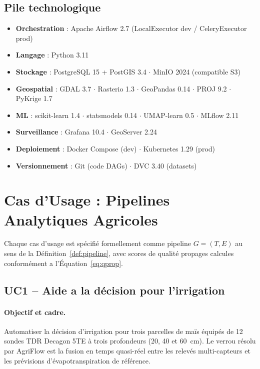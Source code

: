 \documentclass[12pt]{article}
\begin{document}
	\subsection{Pile technologique}
\begin{resultbox}
	\begin{itemize}[noitemsep,leftmargin=1.2em]
		\item \textbf{Orchestration} : Apache Airflow 2.7
		(LocalExecutor dev / CeleryExecutor prod)
		\item \textbf{Langage} : Python 3.11
		\item \textbf{Stockage} : PostgreSQL 15 + PostGIS 3.4 $\cdot$
		MinIO 2024 (compatible S3)
		\item \textbf{Geospatial} : GDAL 3.7 $\cdot$ Rasterio 1.3 $\cdot$
		GeoPandas 0.14 $\cdot$ PROJ 9.2 $\cdot$ PyKrige 1.7
		\item \textbf{ML} : scikit-learn 1.4 $\cdot$ statsmodels 0.14 $\cdot$
		UMAP-learn 0.5 $\cdot$ MLflow 2.11
		\item \textbf{Surveillance} : Grafana 10.4 $\cdot$ GeoServer 2.24
		\item \textbf{Deploiement} : Docker Compose (dev) $\cdot$
		Kubernetes 1.29 (prod)
		\item \textbf{Versionnement} : Git (code DAGs) $\cdot$
		DVC 3.40 (datasets)
	\end{itemize}
\end{resultbox}

	\section{Cas d'Usage : Pipelines Analytiques Agricoles}
\label{sec:usecases}

Chaque cas d'usage est spécifié formellement comme pipeline
$G=(T,E)$ au sens de la Définition~\ref{def:pipeline}, avec
scores de qualité propages calcules conformément a
l’Équation~\eqref{eq:qprop}.

\subsection{UC1 -- Aide a la décision pour l'irrigation}
\label{subsec:uc1}
\paragraph{Objectif et cadre.}
Automatiser la décision d'irrigation pour trois parcelles de maïs
équipés de 12 sondes TDR Decagon 5TE à trois profondeurs
(20, 40 et 60~cm). Le verrou résolu par AgriFlow est la fusion
en temps quasi-réel entre les relevés multi-capteurs et les
prévisions d'évapotranspiration de référence.
\end{document}
